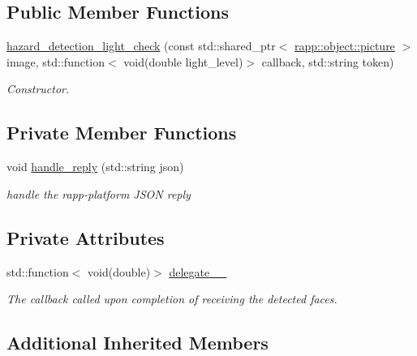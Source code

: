 \subsection*{Public Member Functions}
\begin{DoxyCompactItemize}
\item 
\hyperlink{classrapp_1_1cloud_1_1hazard__detection__light__check_a0c96e78b8b17f775fb35816cc24dbdbc}{hazard\-\_\-detection\-\_\-light\-\_\-check} (const std\-::shared\-\_\-ptr$<$ \hyperlink{classrapp_1_1object_1_1picture}{rapp\-::object\-::picture} $>$ image, std\-::function$<$ void(double light\-\_\-level)$>$ callback, std\-::string token)
\begin{DoxyCompactList}\small\item\em Constructor. \end{DoxyCompactList}\end{DoxyCompactItemize}
\subsection*{Private Member Functions}
\begin{DoxyCompactItemize}
\item 
void \hyperlink{classrapp_1_1cloud_1_1hazard__detection__light__check_abc906b76894a8dd45a589b059c53d02a}{handle\-\_\-reply} (std\-::string json)
\begin{DoxyCompactList}\small\item\em handle the rapp-\/platform J\-S\-O\-N reply \end{DoxyCompactList}\end{DoxyCompactItemize}
\subsection*{Private Attributes}
\begin{DoxyCompactItemize}
\item 
std\-::function$<$ void(double)$>$ \hyperlink{classrapp_1_1cloud_1_1hazard__detection__light__check_acdadeca1ce2b179e39073654fa1ba4ac}{delegate\-\_\-\-\_\-}
\begin{DoxyCompactList}\small\item\em The callback called upon completion of receiving the detected faces. \end{DoxyCompactList}\end{DoxyCompactItemize}
\subsection*{Additional Inherited Members}


